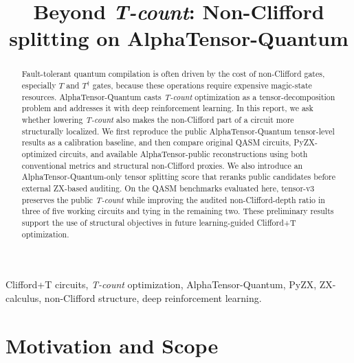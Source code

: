 \documentclass[conference]{IEEEtran}
\newcommand{\atq}{AlphaTensor-Quantum}
\newcommand{\alphapublic}{AlphaTensor-public}
\newcommand{\tcount}{\textit{T-count}}
\newcommand{\tdag}{T^{\dagger}}
\begin{document}
\title{Beyond \tcount{}: Non-Clifford splitting on \atq{}}

\author{
\and
{}
}

\maketitle

\begin{abstract}
Fault-tolerant quantum compilation is often driven by the cost of non-Clifford gates, especially $T$ and $\tdag$ gates, because these operations require expensive magic-state resources. \atq{} casts \tcount{} optimization as a tensor-decomposition problem and addresses it with deep reinforcement learning. In this report, we ask whether lowering \tcount{} also makes the non-Clifford part of a circuit more structurally localized. We first reproduce the public \atq{} tensor-level results as a calibration baseline, and then compare original QASM circuits, PyZX-optimized circuits, and available \alphapublic{} reconstructions using both conventional metrics and structural non-Clifford proxies. We also introduce an \atq{}-only tensor splitting score that reranks public candidates before external ZX-based auditing. On the QASM benchmarks evaluated here, tensor-v3 preserves the public \tcount{} while improving the audited non-Clifford-depth ratio in three of five working circuits and tying in the remaining two. These preliminary results support the use of structural objectives in future learning-guided Clifford+T optimization.
\end{abstract}

\begin{IEEEkeywords}
Clifford+T circuits, \tcount{} optimization, \atq{}, PyZX, ZX-calculus, non-Clifford structure, deep reinforcement learning.
\end{IEEEkeywords}

\section{Motivation and Scope}
\end{document}
